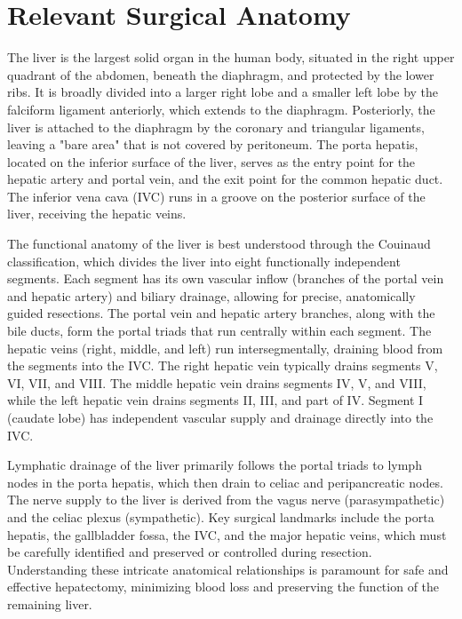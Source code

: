 \section*{Relevant Surgical Anatomy}
The liver is the largest solid organ in the human body, situated in the right upper quadrant of the abdomen, beneath the diaphragm, and protected by the lower ribs. It is broadly divided into a larger right lobe and a smaller left lobe by the falciform ligament anteriorly, which extends to the diaphragm. Posteriorly, the liver is attached to the diaphragm by the coronary and triangular ligaments, leaving a "bare area" that is not covered by peritoneum. The porta hepatis, located on the inferior surface of the liver, serves as the entry point for the hepatic artery and portal vein, and the exit point for the common hepatic duct. The inferior vena cava (IVC) runs in a groove on the posterior surface of the liver, receiving the hepatic veins.

The functional anatomy of the liver is best understood through the Couinaud classification, which divides the liver into eight functionally independent segments. Each segment has its own vascular inflow (branches of the portal vein and hepatic artery) and biliary drainage, allowing for precise, anatomically guided resections. The portal vein and hepatic artery branches, along with the bile ducts, form the portal triads that run centrally within each segment. The hepatic veins (right, middle, and left) run intersegmentally, draining blood from the segments into the IVC. The right hepatic vein typically drains segments V, VI, VII, and VIII. The middle hepatic vein drains segments IV, V, and VIII, while the left hepatic vein drains segments II, III, and part of IV. Segment I (caudate lobe) has independent vascular supply and drainage directly into the IVC.

Lymphatic drainage of the liver primarily follows the portal triads to lymph nodes in the porta hepatis, which then drain to celiac and peripancreatic nodes. The nerve supply to the liver is derived from the vagus nerve (parasympathetic) and the celiac plexus (sympathetic). Key surgical landmarks include the porta hepatis, the gallbladder fossa, the IVC, and the major hepatic veins, which must be carefully identified and preserved or controlled during resection. Understanding these intricate anatomical relationships is paramount for safe and effective hepatectomy, minimizing blood loss and preserving the function of the remaining liver.

